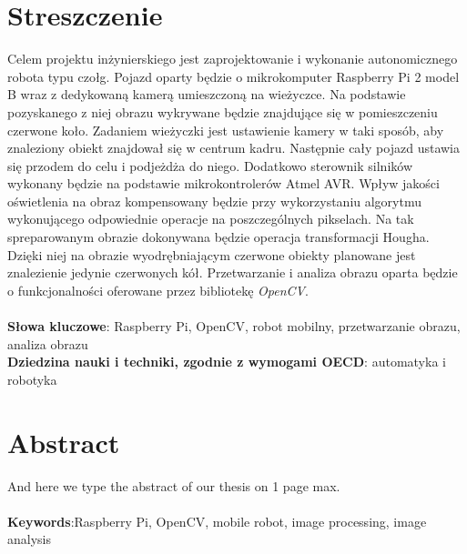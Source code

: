 
\chapter*{Streszczenie}
Celem projektu inżynierskiego jest zaprojektowanie i wykonanie autonomicznego robota typu czołg. Pojazd oparty będzie o mikrokomputer Raspberry Pi 2 model B wraz z dedykowaną kamerą umieszczoną na wieżyczce. Na podstawie pozyskanego z niej obrazu wykrywane będzie znajdujące się w  pomieszczeniu czerwone koło. Zadaniem wieżyczki jest ustawienie kamery w taki sposób, aby znaleziony obiekt znajdował się w centrum kadru. Następnie cały pojazd ustawia się przodem do celu i podjeżdża do niego. Dodatkowo sterownik silników wykonany będzie na podstawie mikrokontrolerów Atmel AVR. Wpływ jakości oświetlenia na obraz kompensowany będzie przy wykorzystaniu algorytmu wykonującego odpowiednie operacje na poszczególnych pikselach. Na tak spreparowanym obrazie dokonywana będzie operacja transformacji Hougha. Dzięki niej na obrazie wyodrębniającym czerwone obiekty planowane jest znalezienie jedynie czerwonych kół. Przetwarzanie i analiza obrazu oparta będzie o funkcjonalności oferowane przez bibliotekę \textit{OpenCV}.
\\\\
\noindent
\textbf{Słowa kluczowe}: Raspberry Pi, OpenCV, robot mobilny, przetwarzanie obrazu, analiza obrazu
\\

\noindent
\textbf{Dziedzina nauki i techniki, zgodnie z wymogami OECD}: automatyka i robotyka
\chapter*{Abstract}
And here we type the abstract of our thesis on 1 page max.
\\\\
\noindent
\textbf{Keywords}:Raspberry Pi, OpenCV, mobile robot, image processing, image analysis